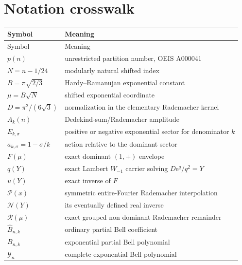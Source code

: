 \documentclass[11pt]{article}
\numberwithin{equation}{section}
\theoremstyle{mainthm}
\theoremstyle{defstyle}
\theoremstyle{remark}
\newcommand{\e}{\mathrm e}
\newcommand{\Ybell}{\mathcal Y}
\newcommand{\Rtail}{\mathcal R}
\newcommand{\Pcal}{\mathcal P}
\newcommand{\Ncal}{\mathcal N}
\begin{document}
\section{Notation crosswalk}\label{app:notation}

\begin{longtable}{p{}p{}}
\toprule
Symbol & Meaning \\
\midrule
\endfirsthead
\toprule
Symbol & Meaning \\
\midrule
\endhead
\(p(n)\) & unrestricted partition number, OEIS A000041 \\
\(N=n-1/24\) & modularly natural shifted index \\
\(B=\pi\sqrt{2/3}\) & Hardy--Ramanujan exponential constant \\
\(\mu=B\sqrt N\) & shifted exponential coordinate \\
\(D=\pi^2/(6\sqrt3)\) & normalization in the elementary Rademacher kernel \\
\(A_k(n)\) & Dedekind-sum/Rademacher amplitude \\
\(E_{k,\sigma}\) & positive or negative exponential sector for denominator \(k\) \\
\(a_{k,\sigma}=1-\sigma/k\) & action relative to the dominant sector \\
\(F(\mu)\) & exact dominant \((1,+)\) envelope \\
\(q(Y)\) & exact Lambert \(W_{-1}\) carrier solving \(D\e^q/q^2=Y\) \\
\(u(Y)\) & exact inverse of \(F\) \\
\(\Pcal(x)\) & symmetric entire-Fourier Rademacher interpolation \\
\(\Ncal(Y)\) & its eventually defined real inverse \\
\(\Rtail(\mu)\) & exact grouped non-dominant Rademacher remainder \\
\(\widehat B_{n,k}\) & ordinary partial Bell coefficient \\
\(B_{n,k}\) & exponential partial Bell polynomial \\
\(\Ybell_n\) & complete exponential Bell polynomial \\
\bottomrule
\end{longtable}
\end{document}
